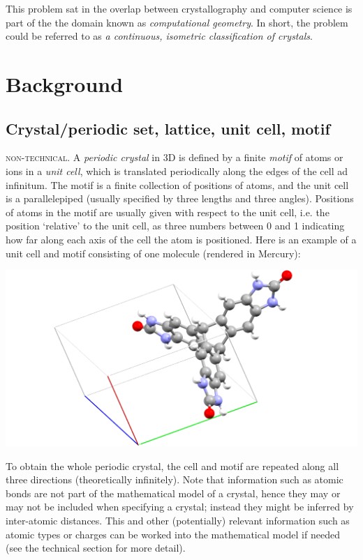 \documentclass[12pt]{article}
\begin{document}
\null

This problem sat in the overlap between crystallography and computer science is part of the the domain known as \emph{computational geometry}. In short, the problem could be referred to as \emph{a continuous, isometric classification of crystals}.

\section{Background}

\subsection{Crystal/periodic set, lattice, unit cell, motif}

\textsc{non-technical.} A \emph{periodic crystal} in 3D is defined by a finite \emph{motif} of atoms or ions in a \emph{unit cell}, which is translated periodically along the edges of the cell ad infinitum. The motif is a finite collection of positions of atoms, and the unit cell is a parallelepiped (usually specified by three lengths and three angles). Positions of atoms in the motif are usually given with respect to the unit cell, i.e. the position `relative' to the unit cell, as three numbers between 0 and 1 indicating how far along each axis of the cell the atom is positioned. Here is an example of a unit cell and motif consisting of one molecule (rendered in Mercury):

\begin{center}
\includegraphics[scale=0.4]{job_03351.png}
\end{center}

To obtain the whole periodic crystal, the cell and motif are repeated along all three directions (theoretically infinitely). Note that information such as atomic bonds are not part of the mathematical model of a crystal, hence they may or may not be included when specifying a crystal; instead they might be inferred by inter-atomic distances. This and other (potentially) relevant information such as atomic types or charges can be worked into the mathematical model if needed (see the technical section for more detail). 
\end{document}
